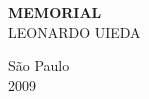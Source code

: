 \begin{titlepage}

\begin{center}



{\LARGE \textbf{MEMORIAL}}
\\[3cm]


{\large LEONARDO UIEDA}
\\[3cm]
\vfill

{\large São Paulo
\\[0.2cm]
2009}


\end{center}

\end{titlepage}

